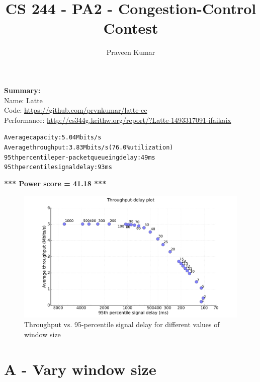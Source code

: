 \documentclass{article}
\begin{document}
\title{CS 244 - PA2 - Congestion-Control Contest}
\author{Praveen Kumar}

\maketitle


\textbf{Summary:}\\
Name: Latte\\
Code: \url{https://github.com/prvnkumar/latte-cc}\\
Performance:
\url{http://cs344g.keithw.org/report/?Latte-1493317091-ifaikaix}
\begin{mdframed}
\begin{alltt}
Average capacity: 5.04 Mbits/s
Average throughput: 3.83 Mbits/s (76.0\% utilization)
95th percentile per-packet queueing delay: 49 ms
95th percentile signal delay: 93 ms
\end{alltt}
\textbf{*** Power score = 41.18 ***}
\end{mdframed}
\clearpage
\begin{figure}[h]
\includegraphics[width=\columnwidth]{"../A/A"}
\caption{Throughput vs. 95-percentile signal delay for different values of window size}
\label{A}
\end{figure}


\section{A - Vary window size}
\end{document}

